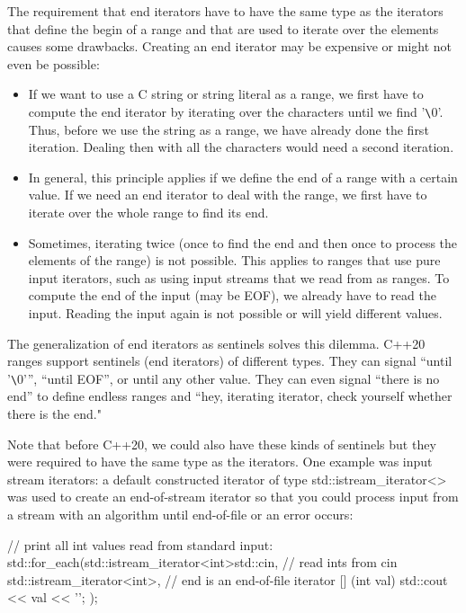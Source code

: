 The requirement that end iterators have to have the same type as the iterators that define the begin of a range and that are used to iterate over the elements causes some drawbacks. Creating an end iterator may be expensive or might not even be possible:

\begin{itemize}
\item
If we want to use a C string or string literal as a range, we first have to compute the end iterator by iterating over the characters until we find ’\verb|\|0’. Thus, before we use the string as a range, we have already done the first iteration. Dealing then with all the characters would need a second iteration.

\item
In general, this principle applies if we define the end of a range with a certain value. If we need an end iterator to deal with the range, we first have to iterate over the whole range to find its end.

\item
Sometimes, iterating twice (once to find the end and then once to process the elements of the range) is not possible. This applies to ranges that use pure input iterators, such as using input streams that we read from as ranges. To compute the end of the input (may be EOF), we already have to read the input. Reading the input again is not possible or will yield different values.
\end{itemize}

The generalization of end iterators as sentinels solves this dilemma. C++20 ranges support sentinels (end iterators) of different types. They can signal “until ’\verb|\|0’”, “until EOF”, or until any other value. They can even signal “there is no end” to define endless ranges and “hey, iterating iterator, check yourself whether there is the end."

Note that before C++20, we could also have these kinds of sentinels but they were required to have the same type as the iterators. One example was input stream iterators: a default constructed iterator of type std::istream\_iterator<> was used to create an end-of-stream iterator so that you could process input from a stream with an algorithm until end-of-file or an error occurs:

\begin{cpp}
// print all int values read from standard input:
std::for_each(std::istream_iterator<int>{std::cin}, // read ints from cin
		std::istream_iterator<int>{}, // end is an end-of-file iterator
		[] (int val) {
			std::cout << val << '\n';
		});
\end{cpp}

